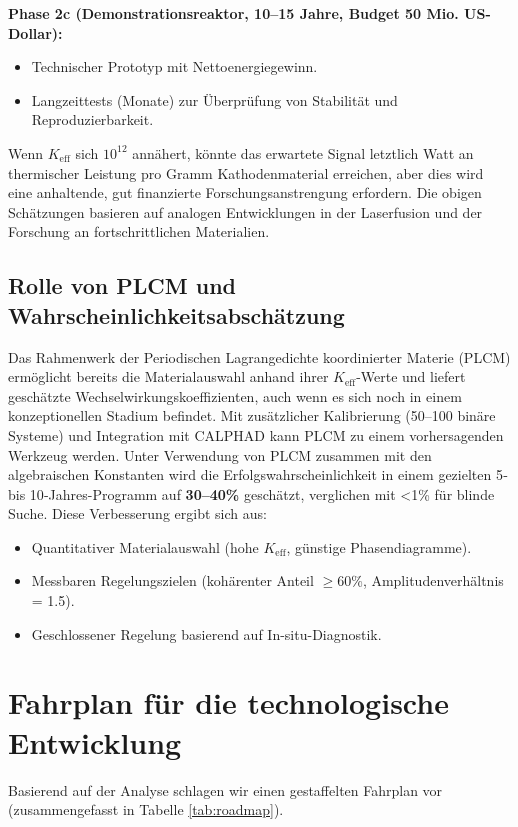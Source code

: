 \documentclass[12pt]{article}
\theoremstyle{remark}
\newcommand{\Keff}{K_{\mathrm{eff}}}
\begin{document}
	\textbf{Phase 2c (Demonstrationsreaktor, 10–15 Jahre, Budget 50 Mio. US-Dollar):}
	\begin{itemize}
		\item Technischer Prototyp mit Nettoenergiegewinn.
		\item Langzeittests (Monate) zur Überprüfung von Stabilität und Reproduzierbarkeit.
	\end{itemize}
	
	Wenn \(\Keff\) sich \(10^{12}\) annähert, könnte das erwartete Signal letztlich Watt an thermischer Leistung pro Gramm Kathodenmaterial erreichen, aber dies wird eine anhaltende, gut finanzierte Forschungsanstrengung erfordern. Die obigen Schätzungen basieren auf analogen Entwicklungen in der Laserfusion und der Forschung an fortschrittlichen Materialien.
	
	\subsection{Rolle von PLCM und Wahrscheinlichkeitsabschätzung}
	
	Das Rahmenwerk der Periodischen Lagrangedichte koordinierter Materie (PLCM) ermöglicht bereits die Materialauswahl anhand ihrer \(K_{\mathrm{eff}}\)-Werte und liefert geschätzte Wechselwirkungskoeffizienten, auch wenn es sich noch in einem konzeptionellen Stadium befindet. Mit zusätzlicher Kalibrierung (50–100 binäre Systeme) und Integration mit CALPHAD kann PLCM zu einem vorhersagenden Werkzeug werden. Unter Verwendung von PLCM zusammen mit den algebraischen Konstanten wird die Erfolgswahrscheinlichkeit in einem gezielten 5‑ bis 10‑Jahres-Programm auf \textbf{30–40\%} geschätzt, verglichen mit <1\% für blinde Suche. Diese Verbesserung ergibt sich aus:
	\begin{itemize}
		\item Quantitativer Materialauswahl (hohe \(K_{\mathrm{eff}}\), günstige Phasendiagramme).
		\item Messbaren Regelungszielen (kohärenter Anteil \(\geq 60\%\), Amplitudenverhältnis = 1.5).
		\item Geschlossener Regelung basierend auf In-situ-Diagnostik.
	\end{itemize}
	
	\section{Fahrplan für die technologische Entwicklung}
	\label{sec:roadmap}
	
	Basierend auf der Analyse schlagen wir einen gestaffelten Fahrplan vor (zusammengefasst in Tabelle \ref{tab:roadmap}).
	
\end{document}
